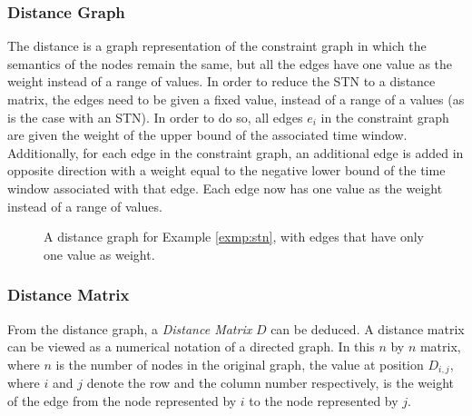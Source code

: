 \documentclass{article}
\theoremstyle{definition}
\begin{document}
\subsubsection{Distance Graph}
The distance is a graph representation of the constraint graph in which the semantics of the nodes remain the same, but all the edges have one value as the weight instead of a range of values. In order to reduce the STN to a distance matrix, the edges need to be given a fixed value, instead of a range of a values (as is the case with an STN). 
In order to do so, all edges $e_i$ in the constraint graph are given the weight of the upper bound of the associated time window. 
Additionally, for each edge in the constraint graph, an additional edge is added in opposite direction with a weight equal to the negative lower bound of the time window associated with that edge. 
Each edge now has one value as the weight instead of a range of values. 

\begin{figure}[h]
	\centering
	\caption{A distance graph for Example \ref{exmp:stn}, with edges that have only one value as weight.}
\end{figure}

\subsubsection{Distance Matrix}
From the distance graph, a \emph{Distance Matrix} $D$ can be deduced. A distance matrix can be viewed as a numerical notation of a directed graph. In this $n$ by $n$ matrix, where $n$ is the number of nodes in the original graph, the value at position $D_{i,j}$, where $i$ and $j$ denote the row and the column number respectively, is the weight of the edge from the node represented by $i$ to the node represented by $j$. 
\end{document}
